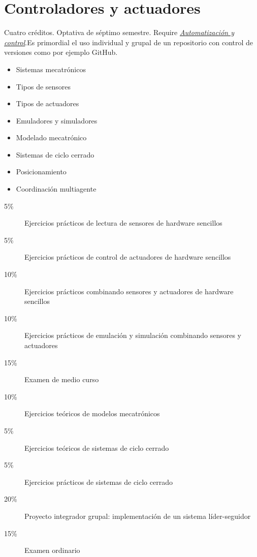 \documentclass{article}
\begin{document}
\begin{multicols}{4}
\vfill\null \columnbreak

\hypertarget{cya}{\section*{Controladores y actuadores}} 

Cuatro cr\'{e}ditos. Optativa de s\'{e}ptimo semestre. Require
\hyperlink{ayc}{\em Automatizaci\'{o}n y control}.Es primordial el uso
individual y grupal de un repositorio con control de versiones como
por ejemplo GitHub.

\begin{itemize}
\item{Sistemas mecatr\'{o}nicos}
\item{Tipos de sensores}
\item{Tipos de actuadores}
\item{Emuladores y simuladores}  
\item{Modelado mecatr\'{o}nico}
\item{Sistemas de ciclo cerrado}
\item{Posicionamiento}
\item{Coordinaci\'{o}n multiagente}
\end{itemize}

\begin{description}
\item[5\%]{Ejercicios pr\'{a}cticos de lectura de sensores de hardware
  sencillos}
\item[5\%]{Ejercicios pr\'{a}cticos de control de actuadores de hardware
  sencillos}
\item[10\%]{Ejercicios pr\'{a}cticos combinando sensores y actuadores de
  hardware sencillos}
\item[10\%]{Ejercicios pr\'{a}cticos de emulaci\'{o}n y simulaci\'{o}n combinando
  sensores y actuadores}
\item[15\%]{Examen de medio curso}  
\item[10\%]{Ejercicios te\'{o}ricos de modelos mecatr\'{o}nicos}
\item[5\%]{Ejercicios te\'{o}ricos de sistemas de ciclo cerrado}
\item[5\%]{Ejercicios pr\'{a}cticos de sistemas de ciclo cerrado}    
\item[20\%]{Proyecto integrador grupal: implementaci\'{o}n de un sistema
  l\'{i}der-seguidor}
\item[15\%]{Examen ordinario}
\end{description}  

\vfill\null \columnbreak


\end{multicols}
\end{document}
